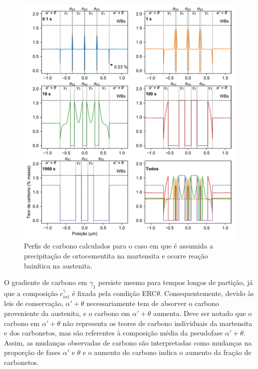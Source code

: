 \begin{figure}
  \includegraphics[width=.9\textwidth]{img/cpartition/cprofiles/coupled_FoFo_375_CCEortho_sep.pdf}
  \caption{Perfis de carbono calculados para o caso em que é assumida a precipitação de ortocementita na martensita e ocorre reação bainítica na austenita.}
  \label{fig:cprofiles_coupled_CCEortho}
\end{figure}

O gradiente de carbono em $\gamma_1$ persiste mesmo para tempos longos de partição, já que a composição $c^\gamma_{int}$ é fixada pela condição ERC$\theta$. Consequentemente, devido às leis de conservação, $\alpha' + \theta$ necessariamente tem de absorver o carbono proveniente da austenita, e o carbono em $\alpha' + \theta$ aumenta. Deve ser notado que o carbono em $\alpha' + \theta$ não representa os teores de carbono individuais da martensita e dos carbonetos, mas são referentes à composição média da pseudofase $\alpha' + \theta$. Assim, as mudanças observadas de carbono são interpretadas como mudanças na proporção de fases $\alpha'$ e $\theta$ e o aumento do carbono indica o aumento da fração de carbonetos. 

